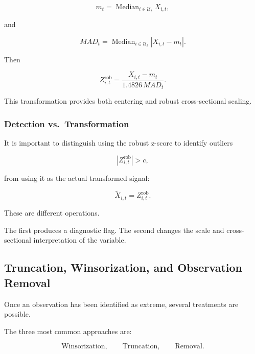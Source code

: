 \documentclass[11pt,a4paper]{article}
\begin{document}
\begin{equation}
m_t
=
\operatorname{Median}_{i\in\mathcal{U}_t}
X_{i,t},
\end{equation}

and

\begin{equation}
MAD_t
=
\operatorname{Median}_{i\in\mathcal{U}_t}
|X_{i,t}-m_t|.
\end{equation}

Then

\begin{equation}
\boxed{
Z_{i,t}^{\mathrm{rob}}
=
\frac{
X_{i,t}-m_t
}{
1.4826\,MAD_t
}.
}
\end{equation}

This transformation provides both centering and robust cross-sectional scaling.


\subsubsection{Detection vs.\ Transformation}

It is important to distinguish using the robust z-score to identify outliers

\begin{equation}
|Z_{i,t}^{\mathrm{rob}}|>c,
\end{equation}

from using it as the actual transformed signal:

\begin{equation}
\widetilde{X}_{i,t}
=
Z_{i,t}^{\mathrm{rob}}.
\end{equation}

These are different operations.

The first produces a diagnostic flag. The second changes the scale and
cross-sectional interpretation of the variable.


\subsection{Truncation, Winsorization, and Observation Removal}
\label{subsec:truncation_winsorization_removal}

Once an observation has been identified as extreme, several treatments are
possible.

The three most common approaches are:

\begin{equation}
\boxed{
\text{Winsorization},
\qquad
\text{Truncation},
\qquad
\text{Removal}.
}
\end{equation}
\end{document}
